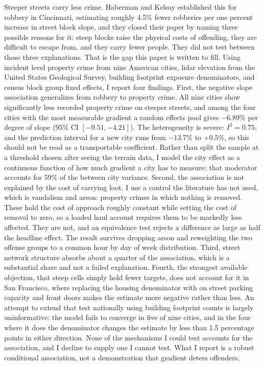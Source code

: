 \documentclass[10pt,letterpaper]{article}
\begin{document}
Steeper streets carry less crime. Haberman and Kelsay established this for robbery
in Cincinnati, estimating roughly 4.5\% fewer robberies per one percent increase in
street block slope, and they closed their paper by naming three possible reasons for
it: steep blocks raise the physical costs of offending, they are difficult to escape
from, and they carry fewer people. They did not test between those three
explanations. That is the gap this paper is written to fill. Using incident level
property crime from nine American cities, lidar elevation from the United States
Geological Survey, building footprint exposure denominators, and census block group
fixed effects, I report four findings. First, the negative slope association
generalizes from robbery to property crime. All nine cities show significantly less
recorded property crime on steeper streets, and among the four cities with the most
measurable gradient a random effects pool gives $-6.89\%$ per degree of slope
(95\% CI $[-9.51, -4.21]$). The heterogeneity is severe: $I^2 = 0.75$, and the
prediction interval for a new city runs from $-13.7\%$ to $+0.5\%$, so this should
not be read as a transportable coefficient. Rather than split the sample at a
threshold chosen after seeing the terrain data, I model the city effect as a
continuous function of how much gradient a city has to measure; that moderator
accounts for 59\% of the between city variance. Second, the association is not
explained by the cost of carrying loot. I use a control the literature has not
used, which is vandalism and arson: property crimes in which nothing is removed.
These hold the cost of approach roughly constant while setting the cost of removal
to zero, so a loaded haul account requires them to be markedly less affected. They
are not, and an equivalence test rejects a difference as large as half the headline
effect. The result survives dropping arson and reweighting the two offense groups
to a common hour by day of week distribution. Third, street network structure
absorbs about a quarter of the association, which is a substantial share and not a
failed explanation. Fourth, the strongest available objection, that steep cells
simply hold fewer targets, does not account for it in San Francisco, where
replacing the housing denominator with on street parking capacity and front doors
makes the estimate more negative rather than less. An attempt to extend that test
nationally using building footprint counts is largely uninformative: the model
fails to converge in five of nine cities, and in the four where it does the
denominator changes the estimate by less than 1.5 percentage points in either
direction. None of the mechanisms I could test accounts for the association, and
I decline to supply one I cannot test. What
I report is a robust conditional association, not a demonstration that gradient
deters offenders.
\end{document}

